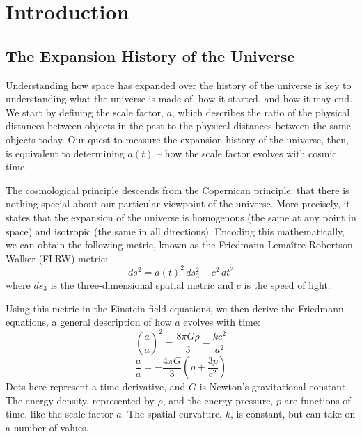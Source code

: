 \chapter{Introduction}
\label{chap:intro}

\section{The Expansion History of the Universe}
Understanding how space has expanded over the history of the universe is key to understanding what the universe is made of, how it started, and how it may end. We start by defining the scale factor, $a$, which describes the ratio of the physical distances between objects in the past to the physical distances between the same objects today. Our quest to measure the expansion history of the universe, then, is equivalent to determining $a(t)$ -- how the scale factor evolves with cosmic time.

The cosmological principle descends from the Copernican principle: that there is nothing special about our particular viewpoint of the universe. More precisely, it states that the expansion of the universe is homogenous (the same at any point in space) and isotropic (the same in all directions). Encoding this mathematically, we can obtain the following metric, known as the Friedmann-Lema\^{i}tre-Robertson-Walker (FLRW) metric:
\begin{equation}
    ds^2 = a(t)^2\,ds_3^2 - c^2\,dt^2
    \label{eqn:flrw_metric}
\end{equation}
where $ds_3$ is the three-dimensional spatial metric and $c$ is the speed of light.

Using this metric in the Einstein field equations, we then derive the Friedmann equations, a general description of how $a$ evolves with time:
\begin{equation}
    \left(\frac{\dot{a}}{a}\right)^2 = \frac{8\pi G\rho}{3} - \frac{kc^2}{a^2}
    \label{eqn:friedmann}
\end{equation}
\begin{equation}
    \frac{\ddot{a}}{a} = -\frac{4\pi G}{3}\left(\rho + \frac{3p}{c^2}\right)
    \label{eqn:friedmann_acceleration}
\end{equation}
Dots here represent a time derivative, and $G$ is Newton's gravitational constant. The energy density, represented by $\rho$, and the energy pressure, $p$ are functions of time, like the scale factor $a$. The spatial curvature, $k$, is constant, but can take on a number of values.

